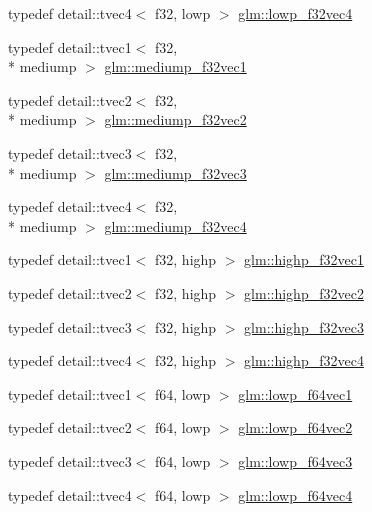 \begin{DoxyCompactItemize}
\item 
typedef detail\-::tvec4$<$ f32, lowp $>$ \hyperlink{group__gtc__type__precision_ga59f7292d7ed0b7df72e6aa31010e2648}{glm\-::lowp\-\_\-f32vec4}
\item 
typedef detail\-::tvec1$<$ f32, \\*
mediump $>$ \hyperlink{group__gtc__type__precision_gaf3d4077b241fbcab529fb0e0d88c0df6}{glm\-::mediump\-\_\-f32vec1}
\item 
typedef detail\-::tvec2$<$ f32, \\*
mediump $>$ \hyperlink{group__gtc__type__precision_gaf53d380f948fdbb540eab960f2ad4b58}{glm\-::mediump\-\_\-f32vec2}
\item 
typedef detail\-::tvec3$<$ f32, \\*
mediump $>$ \hyperlink{group__gtc__type__precision_gada8879dd10f28428e2eb1ae62f643f65}{glm\-::mediump\-\_\-f32vec3}
\item 
typedef detail\-::tvec4$<$ f32, \\*
mediump $>$ \hyperlink{group__gtc__type__precision_gaa5a1b058d185d87504591a11c6247518}{glm\-::mediump\-\_\-f32vec4}
\item 
typedef detail\-::tvec1$<$ f32, highp $>$ \hyperlink{group__gtc__type__precision_gac8be8ce31b9df0a5005d7c7458a3d03e}{glm\-::highp\-\_\-f32vec1}
\item 
typedef detail\-::tvec2$<$ f32, highp $>$ \hyperlink{group__gtc__type__precision_gabba3e1b3ae0bcaa7aaac573c08c2f8d3}{glm\-::highp\-\_\-f32vec2}
\item 
typedef detail\-::tvec3$<$ f32, highp $>$ \hyperlink{group__gtc__type__precision_ga581a4a4eb1f3a269d16af0c4e2d8daf4}{glm\-::highp\-\_\-f32vec3}
\item 
typedef detail\-::tvec4$<$ f32, highp $>$ \hyperlink{group__gtc__type__precision_ga53d3c1a17e2e6f26ee5ad1e8879d710e}{glm\-::highp\-\_\-f32vec4}
\item 
typedef detail\-::tvec1$<$ f64, lowp $>$ \hyperlink{group__gtc__type__precision_ga47d9eed23b6e3fc58676176be392293a}{glm\-::lowp\-\_\-f64vec1}
\item 
typedef detail\-::tvec2$<$ f64, lowp $>$ \hyperlink{group__gtc__type__precision_gaf2c6cba98bb2c2f1560d8edff4b70938}{glm\-::lowp\-\_\-f64vec2}
\item 
typedef detail\-::tvec3$<$ f64, lowp $>$ \hyperlink{group__gtc__type__precision_gad2d5e1436d926ae7201c860dce01a0fe}{glm\-::lowp\-\_\-f64vec3}
\item 
typedef detail\-::tvec4$<$ f64, lowp $>$ \hyperlink{group__gtc__type__precision_gaf99497c42a2d011fecab7f3f2312213d}{glm\-::lowp\-\_\-f64vec4}

\end{DoxyCompactItemize}
